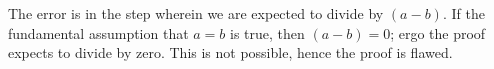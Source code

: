 The error is in the step wherein we are expected to divide by $(a-b)$. If the fundamental assumption that $a=b$ is true, then $(a-b)=0$; ergo the proof expects to divide by zero. This is not possible, hence the proof is flawed.